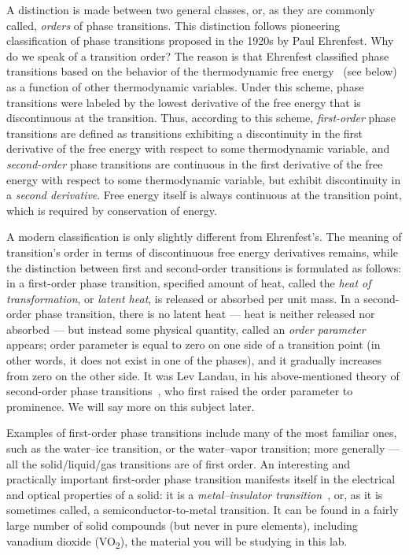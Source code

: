 \documentclass[11pt,a4paper]{article}
\newcommand{\VOtwo}{VO\textsubscript{2}}
\begin{document}
A distinction is made between two general classes, or, as they are commonly
called, \emph{orders} of phase transitions. This distinction follows pioneering
classification of phase transitions proposed in the 1920s by Paul Ehrenfest. Why do we speak of a transition order? The reason is that Ehrenfest
classified phase transitions based on the behavior of the thermodynamic free
energy~\cite{ref:gittrman,ref:papon} (see below) as a function of other
thermodynamic variables. Under this scheme, phase transitions were labeled by
the lowest derivative of the free energy that is discontinuous at the transition.
Thus, according to this scheme, \emph{first-order} phase transitions are defined
as transitions exhibiting a discontinuity in the first derivative of the free
energy with respect to some thermodynamic variable, and \emph{second-order} phase
transitions are continuous in the first derivative of the free energy with
respect to some thermodynamic variable, but exhibit discontinuity in a
\emph{second derivative}. Free energy itself is always continuous at the
transition point, which is required by conservation of energy.

A modern classification is only slightly different from Ehrenfest's. The meaning
of transition's order in terms of discontinuous free energy derivatives remains,
while the distinction between first and second-order transitions is formulated as
follows: in a first-order phase transition, specified amount of heat, called the
\emph{heat of transformation}, or \emph{latent heat}, is released or absorbed per
unit mass. In a second-order phase transition, there is no latent heat --- heat
is neither released nor absorbed --- but instead some physical quantity, called
an \emph{order parameter} appears; order parameter is equal to zero on one side
of a transition point (in other words, it does not exist in one of the phases),
and it gradually increases from zero on the other side. It
was Lev Landau, in his above-mentioned theory of second-order phase
transitions~\cite{ref:gittrman,ref:papon,ref:landau1,ref:landau2}, who first
raised the order parameter to prominence. We will say more on this subject later.

Examples of first-order phase transitions include many of the most familiar ones,
such as the water--ice transition, or the water--vapor transition; more
generally --- all the solid/liquid/gas transitions are of first order. An
interesting and practically important first-order phase transition manifests
itself in the electrical and optical properties of a solid: it is a
\emph{metal--insulator transition}~\cite{ref:dobro,ref:mottbook,ref:mott1949},
or, as it is sometimes called, a semiconductor-to-metal transition. It can be
found in a fairly large number of solid compounds (but never in pure elements),
including vanadium dioxide (\VOtwo), the material you will be studying in this
lab.
\end{document}
